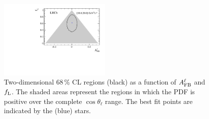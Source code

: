 \begin{figure}[h]
\includegraphics[width=0.49\textwidth]{Lmumu/figs/paper/figure10e.pdf}
\caption{Two-dimensional 68\,\% CL regions (black) as a
  function of $A_{\rm FB}^\ell$ and $f_{\rm L}$.  The shaded areas
  represent the regions in which the PDF is positive over the complete $\cos
  \theta_{\ell}$ range. The best fit points are indicated by the (blue) stars. }
\label{fig:contours}
\end{figure}
